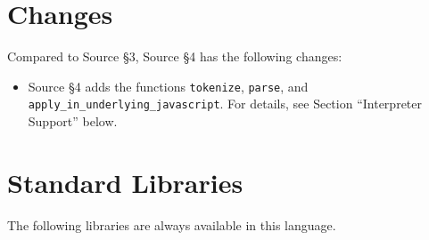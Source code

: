 





\section{Changes}

Compared to Source \S 3, Source \S 4 has the following changes:
\begin{itemize}
\item Source \S 4 adds the functions \lstinline{tokenize}, \lstinline{parse}, and
\lstinline{apply_in_underlying_javascript}. 
For details, see 
Section ``Interpreter Support'' below.
\end{itemize}





\newpage





















\section{Standard Libraries}

The following libraries are always available in this language.

















\newpage



\newpage



    
